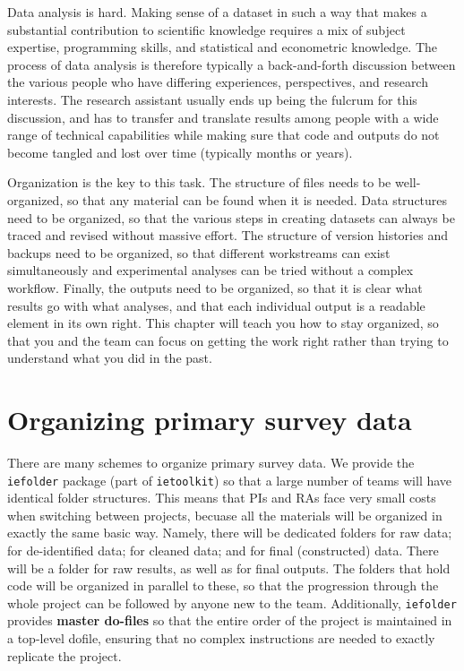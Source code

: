 
\begin{fullwidth}
Data analysis is hard. Making sense of a dataset in such a way
that makes a substantial contribution to scientific knowledge
requires a mix of subject expertise, programming skills,
and statistical and econometric knowledge.
The process of data analysis is therefore typically
a back-and-forth discussion between the various people
who have differing experiences, perspectives, and research interests.
The research assistant usually ends up being the fulcrum
for this discussion, and has to transfer and translate
results among people with a wide range of technical capabilities
while making sure that code and outputs do not become
tangled and lost over time (typically months or years).

Organization is the key to this task.
The structure of files needs to be well-organized,
so that any material can be found when it is needed.
Data structures need to be organized,
so that the various steps in creating datasets
can always be traced and revised without massive effort.
The structure of version histories and backups need to be organized,
so that different workstreams can exist simultaneously
and experimental analyses can be tried without a complex workflow.
Finally, the outputs need to be organized,
so that it is clear what results go with what analyses,
and that each individual output is a readable element in its own right.
This chapter will teach you how to stay organized,
so that you and the team can focus on getting the work right
rather than trying to understand what you did in the past.
\end{fullwidth}


\section{Organizing primary survey data}

There are many schemes to organize primary survey data.
We provide the \texttt{iefolder}
package (part of \texttt{ietoolkit}) so that
a large number of teams will have identical folder structures.
This means that PIs and RAs face very small costs
when switching between projects, becuase all the materials
will be organized in exactly the same basic way.
Namely, there will be dedicated folders for raw data;
for de-identified data; for cleaned data; and for final (constructed) data.
There will be a folder for raw results, as well as for final outputs.
The folders that hold code will be organized in parallel to these,
so that the progression through the whole project can be followed
by anyone new to the team. Additionally, \texttt{iefolder}
provides \textbf{master do-files} so that the entire order
of the project is maintained in a top-level dofile,
ensuring that no complex instructions are needed
to exactly replicate the project.

